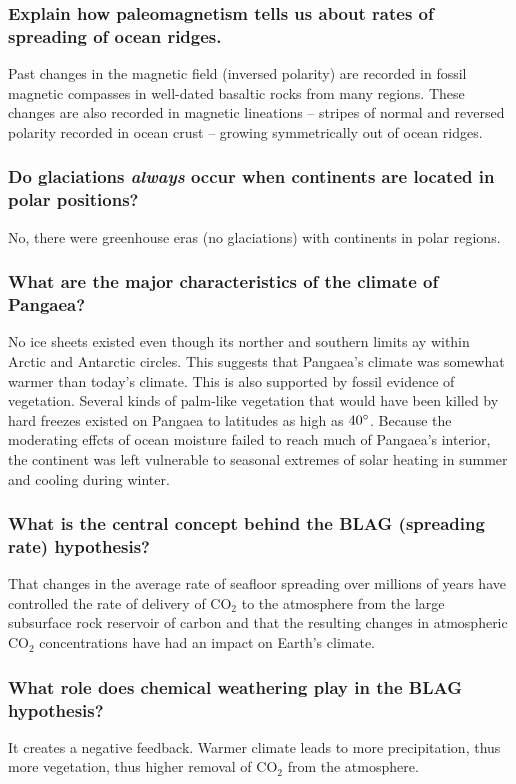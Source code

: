 \subsubsection{Explain how paleomagnetism tells us about rates of spreading of
ocean ridges.}
Past changes in the magnetic field (inversed polarity) are recorded in fossil
magnetic compasses in well-dated basaltic rocks from many regions. These
changes are also recorded in magnetic lineations -- stripes of normal and
reversed polarity recorded in ocean crust -- growing symmetrically out of ocean
ridges.

\subsubsection{Do glaciations \textit{always} occur when continents are located
in polar positions?}
No, there were greenhouse eras (no glaciations) with continents in polar
regions.

\subsubsection{What are the major characteristics of the climate of Pangaea?}
No ice sheets existed even though its norther and southern limits ay within
Arctic and Antarctic circles. This suggests that Pangaea's climate was
somewhat warmer than today's climate. This is also supported by fossil evidence
of vegetation. Several kinds of palm-like vegetation that would have been
killed by hard freezes existed on Pangaea to latitudes as high as $40 \degree$.
Because the moderating effcts of ocean moisture failed to reach much of
Pangaea's interior, the continent was left vulnerable to seasonal extremes of
solar heating in summer and cooling during winter.

\subsubsection{What is the central concept behind the BLAG (spreading rate)
hypothesis?}
That changes in the average rate of seafloor spreading over millions of years
have controlled the rate of delivery of CO$_2$ to the atmosphere from the
large subsurface rock reservoir of carbon and that the resulting changes in
atmospheric CO$_2$ concentrations have had an impact on Earth's climate.

\subsubsection{What role does chemical weathering play in the BLAG hypothesis?}
It creates a negative feedback. Warmer climate leads to more precipitation,
thus more vegetation, thus higher removal of CO$_2$ from the atmosphere.

